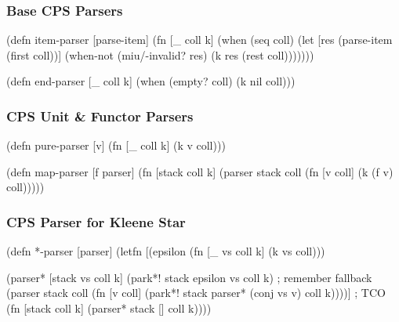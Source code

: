 \documentclass{beamer}
\begin{document}

\begin{frame}[fragile]
\frametitle{Base CPS Parsers}

\begin{semiverbatim}
(defn item-parser [parse-item]
  (fn [_ coll k]
    (when (seq coll)
      (let [res (parse-item (first coll))]
        (when-not (miu/-invalid? res)
          (k res (rest coll)))))))
\end{semiverbatim}

\begin{semiverbatim}
(defn end-parser [_ coll k]
  (when (empty? coll)
    (k nil coll)))
\end{semiverbatim}

\end{frame}


\begin{frame}[fragile]
\frametitle{CPS Unit \& Functor Parsers}

\begin{semiverbatim}
(defn pure-parser [v] (fn [_ coll k] (k v coll)))
\end{semiverbatim}

\begin{semiverbatim}
(defn map-parser [f parser]
  (fn [stack coll k]
    (parser stack coll
            (fn [v coll] (k (f v) coll)))))
\end{semiverbatim}

\end{frame}


\begin{frame}[fragile]
\frametitle{CPS Parser for Kleene Star}

{\scriptsize
\begin{semiverbatim}
(defn *-parser [parser]
  (letfn [(epsilon (fn [_ vs coll k] (k vs coll)))

          (parser* [stack vs coll k]
            (park*! stack epsilon vs coll k) ; remember fallback
            (parser stack coll
                    (fn [v coll]
                      (park*! stack parser* (conj vs v) coll k))))] ; TCO
    (fn [stack coll k] (parser* stack [] coll k))))
\end{semiverbatim}
}

\end{frame}

\end{document}
